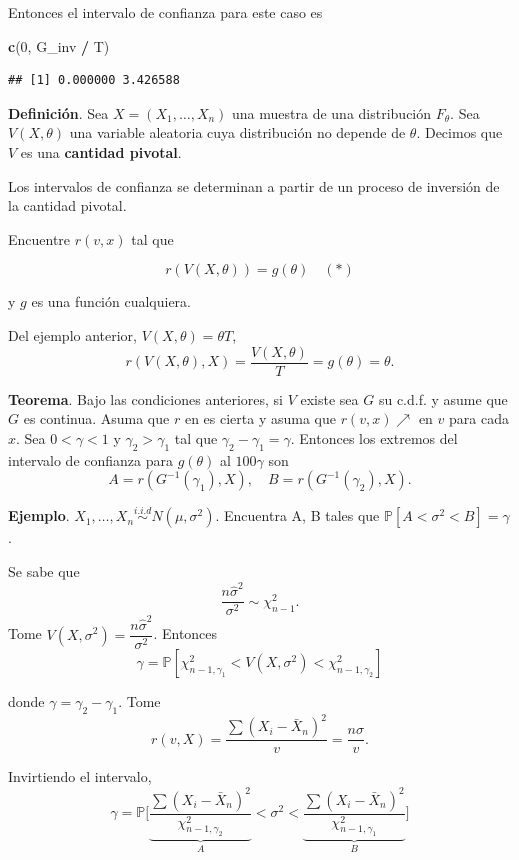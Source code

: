 \documentclass[
  12pt,
]{book}
\newenvironment{Shaded}{\begin{snugshade}}{\end{snugshade}}
\newcommand{\DecValTok}[1]{\textcolor[rgb]{0.00,0.00,0.81}{#1}}
\newcommand{\KeywordTok}[1]{\textcolor[rgb]{0.13,0.29,0.53}{\textbf{#1}}}
\newcommand{\NormalTok}[1]{#1}
\newcommand{\OperatorTok}[1]{\textcolor[rgb]{0.81,0.36,0.00}{\textbf{#1}}}
\newcommand{\StringTok}[1]{\textcolor[rgb]{0.31,0.60,0.02}{#1}}
\begin{document}
Entonces el intervalo de confianza para este caso es

\begin{Shaded}
\begin{Highlighting}[]
\KeywordTok{c}\NormalTok{(}\DecValTok{0}\NormalTok{, G\_inv }\OperatorTok{/}\StringTok{ }\NormalTok{T)}
\end{Highlighting}
\end{Shaded}

\begin{verbatim}
## [1] 0.000000 3.426588
\end{verbatim}

\textbf{Definición}. Sea \(X = (X_1,\dots,X_n)\) una muestra de una distribución
\(F_\theta\). Sea \(V(X,\theta)\) una variable aleatoria cuya distribución no
depende de \(\theta\). Decimos que \(V\) es una \textbf{cantidad pivotal}.

Los intervalos de confianza se determinan a partir de un proceso de inversión de
la cantidad pivotal.

Encuentre \(r(v,x)\) tal que

\[r(V(X,\theta)) = g(\theta) \quad (*)\]

y \(g\) es una función cualquiera.

Del ejemplo anterior, \(V(X,\theta) = \theta T\), \[r(V(X,\theta),X) = \dfrac{V(X,\theta)}T
= g(\theta) = \theta.\]

\textbf{Teorema}. Bajo las condiciones anteriores, si \(V\) existe sea \(G\) su c.d.f. y
asume que \(G\) es continua. Asuma que \(r\) en es cierta y asuma que \(r(v,x) \nearrow\) en \(v\) para cada \(x\). Sea \(0<\gamma<1\) y \(\gamma_2>\gamma_1\) tal que \(\gamma_2-\gamma_1 = \gamma\). Entonces los extremos del intervalo de confianza para \(g(\theta)\) al
\(100\gamma\) son \[A=r(G^{-1}(\gamma_1),X), \quad B=r(G^{-1}(\gamma_2),X).\]

\textbf{Ejemplo}. \(X_1,\dots, X_n \stackrel{i.i.d}{\sim} N(\mu,\sigma^2)\). Encuentra A, B tales
que \(\mathbb P[A<\sigma^2<B] = \gamma\).

Se sabe que \[\dfrac{n\hat\sigma^2}{\sigma^2}\sim \chi^2_{n-1}.\] Tome \(V(X,\sigma^2) = \dfrac{n\hat\sigma^2}{\sigma^2}\). Entonces \[\gamma = \mathbb
P[\chi^2_{n-1,\gamma_1}<V(X,\sigma^2)<\chi^2_{n-1,\gamma_2}]\]

donde \(\gamma = \gamma_2-\gamma_1\). Tome \[r(v,X) =\dfrac{\sum(X_i -\bar X_n) ^2}{v} =
\dfrac{n\hat\sigma}{v}.\]

Invirtiendo el intervalo, \[\gamma = \mathbb P \bigg[ \underbrace{\dfrac{\sum(X_i -\bar
X_n) ^2}{\chi^2_{n-1,\gamma_2}}} _{A} <\sigma^2<\underbrace{\dfrac{\sum(X_i -\bar X_n)
^2}{\chi^2_{n-1,\gamma_1}}}_B\bigg]\]
\end{document}
